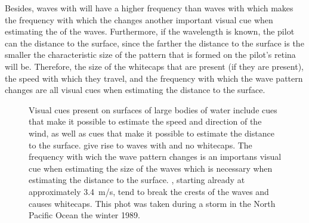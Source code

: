 Besides, waves with  will have a higher frequency than waves with  which makes the frequency with which the  changes another important visual cue when estimating the  of the waves. Furthermore, if the wavelength is known, the pilot can \estimate the distance to the surface, since the farther the distance to the surface is the smaller the characteristic size of the pattern that is formed on the pilot's retina will be. Therefore, the size of the whitecaps that are present (if they are present), the speed with which they travel, and the frequency with which the wave pattern changes are all visual cues when estimating the distance to the surface.

\begin{figure}
    \centering
    \caption{Visual cues present on surfaces of large bodies of water include cues that make it possible to estimate the speed and direction of the wind, as well as cues that make it possible to estimate the distance to the surface.   give rise to waves with  and no whitecaps. The frequency with wich the wave pattern changes is an importans visual cue when estimating the size of the waves which is necessary when estimating the distance to the surface.  , starting already at approximately 3.4~m/s, tend to break the crests of the waves and causes whitecaps. This phot was taken during a storm in the North Pacific Ocean the winter 1989.}
    \label{fig:sea_states}
\end{figure}

